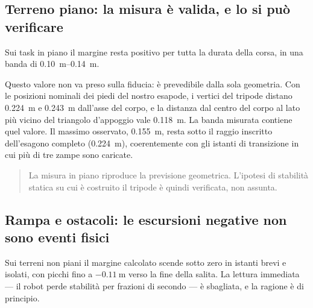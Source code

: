 \subsection{Terreno piano: la misura è valida, e lo si può verificare}

Sui task in piano il margine resta positivo per tutta la durata della corsa,
in una banda di \SIrange{0.10}{0.14}{\meter}.

Questo valore non va preso sulla fiducia: è prevedibile dalla sola geometria.
Con le posizioni nominali dei piedi del nostro esapode, i vertici del tripode
distano \SI{0.224}{\meter} e \SI{0.243}{\meter} dall'asse del corpo, e la
distanza dal centro del corpo al lato più vicino del triangolo d'appoggio vale
\SI{0.118}{\meter}. La banda misurata contiene quel valore. Il massimo
osservato, \SI{0.155}{\meter}, resta sotto il raggio inscritto dell'esagono
completo (\SI{0.224}{\meter}), coerentemente con gli istanti di transizione in
cui più di tre zampe sono caricate.

\begin{quote}
La misura in piano riproduce la previsione geometrica. L'ipotesi di stabilità
statica su cui è costruito il tripode è quindi verificata, non assunta.
\end{quote}


\subsection{Rampa e ostacoli: le escursioni negative non sono eventi fisici}

Sui terreni non piani il margine calcolato scende sotto zero in istanti brevi
e isolati, con picchi fino a $-\SI{0.11}{\meter}$ verso la fine della salita.
La lettura immediata — il robot perde stabilità per frazioni di secondo — è
sbagliata, e la ragione è di principio.

